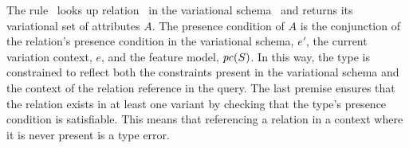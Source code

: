 The rule \relationE\ looks up relation \vRel\ in the variational schema \vSch\ and
returns its variational set of attributes $A$. The presence condition of $A$ is the
conjunction of the relation's presence condition in the variational schema, $e'$, the
current variation context, $e$, and the feature model, $\getPC{\vSch}$. In this
way, the type is constrained to reflect both the constraints present in the
variational schema and the context of the relation reference in the query.
%
The last premise ensures that the relation exists in at least one variant by
checking that the type's presence condition is satisfiable. This means that
referencing a relation in a context where it is never present is a type error.


